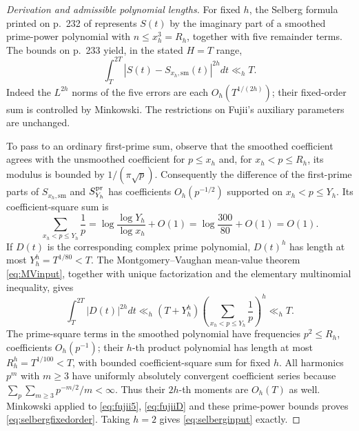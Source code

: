 \documentclass[11pt,reqno]{amsart}
\numberwithin{equation}{section}
\begin{document}
\begin{proof}[Derivation and admissible polynomial lengths]
For fixed $h$, the Selberg formula printed on p.~232
of \cite{Fujii1974} represents $S(t)$ by the imaginary
part of a smoothed prime-power polynomial with
$n\le x_h^3=R_h$, together with five remainder terms.
The bounds on p.~233 yield, in the stated $H=T$ range,
\begin{equation}\label{eq:fujii5}
\int_T^{2T}|S(t)-S_{x_h,\mathrm{sm}}(t)|^{2h}dt
 \ll_h T.
\end{equation}
Indeed the $L^{2h}$ norms of the five errors are each
$O_h(T^{1/(2h)})$; their fixed-order sum is controlled
by Minkowski. The restrictions on Fujii's auxiliary
parameters are unchanged.

To pass to an ordinary first-prime sum, observe that the
smoothed coefficient agrees with the unsmoothed coefficient
for $p\le x_h$ and, for $x_h<p\le R_h$, its modulus is
bounded by $1/(\pi\sqrt p)$. Consequently the difference
of the first-prime parts of $S_{x_h,\mathrm{sm}}$ and
$S^{\rm pr}_{Y_h}$ has coefficients $O_h(p^{-1/2})$
supported on $x_h<p\le Y_h$. Its coefficient-square
sum is
\begin{equation}\label{eq:fujiiV}
\sum_{x_h<p\le Y_h}\frac1p
=\log\frac{\log Y_h}{\log x_h}+O(1)
=\log\frac{300}{80}+O(1)=O(1).
\end{equation}
If $D(t)$ is the corresponding complex prime polynomial,
$D(t)^h$ has length at most
$Y_h^h=T^{1/80}<T$. The Montgomery--Vaughan
mean-value theorem \eqref{eq:MVinput}, together with
unique factorization and the elementary multinomial
inequality, gives
\begin{equation}\label{eq:fujiiD}
\int_T^{2T}|D(t)|^{2h}dt
\ll_h (T+Y_h^h)
\left(\sum_{x_h<p\le Y_h}\frac1p\right)^h
\ll_h T.
\end{equation}
The prime-square terms in the smoothed polynomial have
frequencies $p^2\le R_h$, coefficients $O_h(p^{-1})$;
their $h$-th product polynomial has length at most
$R_h^h=T^{1/100}<T$, with bounded coefficient-square
sum for fixed $h$. All harmonics $p^m$ with $m\ge3$
have uniformly absolutely convergent coefficient series
because $\sum_p\sum_{m\ge3}p^{-m/2}/m<\infty$.
Thus their $2h$-th moments are $O_h(T)$ as well.
Minkowski applied to \eqref{eq:fujii5}, \eqref{eq:fujiiD}
and these prime-power bounds proves \eqref{eq:selbergfixedorder}.
Taking $h=2$ gives \eqref{eq:selberginput} exactly.
\end{proof}
\end{document}
